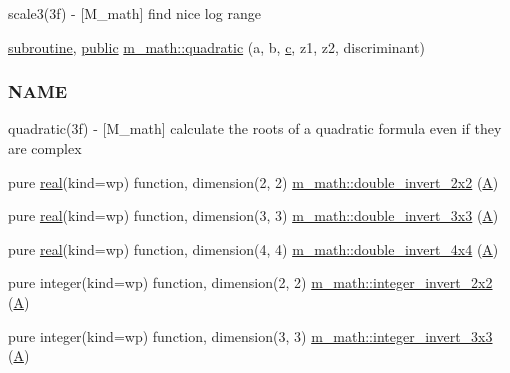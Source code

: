 \begin{DoxyCompactItemize}
\begin{DoxyCompactList}
scale3(3f) -\/ \mbox{[}M\+\_\+math\mbox{]} find nice log range \end{DoxyCompactList}\item 
\hyperlink{M__stopwatch_83_8txt_acfbcff50169d691ff02d4a123ed70482}{subroutine}, \hyperlink{M__stopwatch_83_8txt_a2f74811300c361e53b430611a7d1769f}{public} \hyperlink{namespacem__math_a59bbb085b083b802178b8de41c9bb343}{m\+\_\+math\+::quadratic} (a, b, \hyperlink{c_8f90_aeb1f4e639be0213b4cbd07f2583a5b1f}{c}, z1, z2, discriminant)
\begin{DoxyCompactList}\small\item\em \subsubsection*{N\+A\+ME}

quadratic(3f) -\/ \mbox{[}M\+\_\+math\mbox{]} calculate the roots of a quadratic formula even if they are complex \end{DoxyCompactList}\item 
pure \hyperlink{read__watch_83_8txt_abdb62bde002f38ef75f810d3a905a823}{real}(kind=wp) function, dimension(2, 2) \hyperlink{namespacem__math_ae65562df2e78e7ebc0660a8f8b3a4030}{m\+\_\+math\+::double\+\_\+invert\+\_\+2x2} (\hyperlink{ufpp__overview_81_8txt_a8341271e5f4e3003f6eb1c9547fc9d1a}{A})
\item 
pure \hyperlink{read__watch_83_8txt_abdb62bde002f38ef75f810d3a905a823}{real}(kind=wp) function, dimension(3, 3) \hyperlink{namespacem__math_a7ff8d2485bffbbe9fce3e13d62a19677}{m\+\_\+math\+::double\+\_\+invert\+\_\+3x3} (\hyperlink{ufpp__overview_81_8txt_a8341271e5f4e3003f6eb1c9547fc9d1a}{A})
\item 
pure \hyperlink{read__watch_83_8txt_abdb62bde002f38ef75f810d3a905a823}{real}(kind=wp) function, dimension(4, 4) \hyperlink{namespacem__math_a258a8a014e105b40c2653d3036e7ddb6}{m\+\_\+math\+::double\+\_\+invert\+\_\+4x4} (\hyperlink{ufpp__overview_81_8txt_a8341271e5f4e3003f6eb1c9547fc9d1a}{A})
\item 
pure integer(kind=wp) function, dimension(2, 2) \hyperlink{namespacem__math_abccb5c1bfc17724aca07448be7b1d2c8}{m\+\_\+math\+::integer\+\_\+invert\+\_\+2x2} (\hyperlink{ufpp__overview_81_8txt_a8341271e5f4e3003f6eb1c9547fc9d1a}{A})
\item 
pure integer(kind=wp) function, dimension(3, 3) \hyperlink{namespacem__math_aa8aaf1df6257440a637e51922f2d482f}{m\+\_\+math\+::integer\+\_\+invert\+\_\+3x3} (\hyperlink{ufpp__overview_81_8txt_a8341271e5f4e3003f6eb1c9547fc9d1a}{A})
\item 

\end{DoxyCompactItemize}
